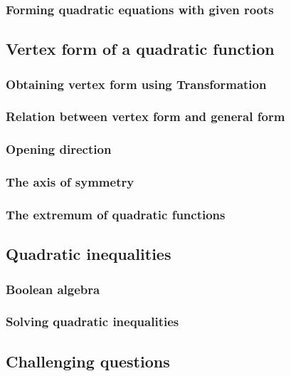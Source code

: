 \documentclass[12pt]{article}
\begin{document}
    \subsubsection*{Forming quadratic equations with given roots}

    \subsection{Vertex form of a quadratic function}

    \subsubsection*{Obtaining vertex form using Transformation}

    \subsubsection*{Relation between vertex form and general form}

    \subsubsection*{Opening direction}

    \subsubsection*{The axis of symmetry}

    \subsubsection*{The extremum of quadratic functions}

    \subsection{Quadratic inequalities}

    \subsubsection*{Boolean algebra}

    \subsubsection*{Solving quadratic inequalities}

    \subsection{Challenging questions}
\end{document}
